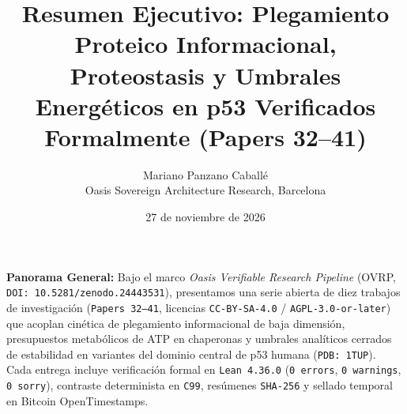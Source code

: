 \documentclass[11pt,a4paper]{article}
\title{Resumen Ejecutivo: Plegamiento Proteico Informacional, Proteostasis y Umbrales Energ\'eticos en p53 Verificados Formalmente (Papers 32--41)}
\author{Mariano Panzano Caball\'e \\ \small Oasis Sovereign Architecture Research, Barcelona}
\date{27 de noviembre de 2026}
\begin{document}
\maketitle

\noindent\textbf{Panorama General:}
Bajo el marco \emph{Oasis Verifiable Research Pipeline} (OVRP, \texttt{DOI: 10.5281/zenodo.24443531}), presentamos una serie abierta de diez trabajos de investigaci\'on (\texttt{Papers 32--41}, licencias \texttt{CC-BY-SA-4.0} / \texttt{AGPL-3.0-or-later}) que acoplan cin\'etica de plegamiento informacional de baja dimensi\'on, presupuestos metab\'olicos de ATP en chaperonas y umbrales anal\'iticos cerrados de estabilidad en variantes del dominio central de p53 humana (\texttt{PDB: 1TUP}). Cada entrega incluye verificaci\'on formal en \texttt{Lean~4.36.0} (\texttt{0~errors}, \texttt{0~warnings}, \texttt{0~sorry}), contraste determinista en \texttt{C99}, res\'umenes \texttt{SHA-256} y sellado temporal en Bitcoin OpenTimestamps.
\end{document}
